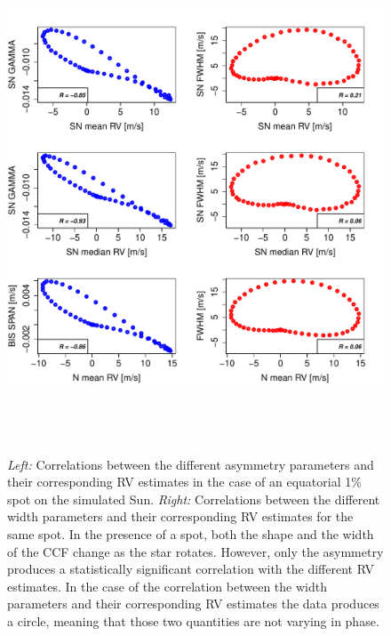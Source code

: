 \documentclass{aa}
\begin{document}
\begin{figure}[htbp]
\begin{center}
\includegraphics[height = 6in]{SOAP_SPOT_Comparison_para_SN.pdf} 
   \caption{\emph{Left:} Correlations between the different asymmetry parameters and their corresponding RV estimates in the case of an equatorial 1\% spot on the simulated Sun. \emph{Right:} Correlations between the different width parameters and their corresponding RV estimates for the same spot. In the presence of a spot, both the shape and the width of the CCF change as the star rotates. However, only the asymmetry produces a statistically significant correlation with the different RV estimates. In the case of the correlation between the width parameters and their corresponding RV estimates the data produces a circle, meaning that those two quantities are not varying in phase.}
    \label{fig:spot.corr}
\end{center}
\end{figure}
\end{document}
